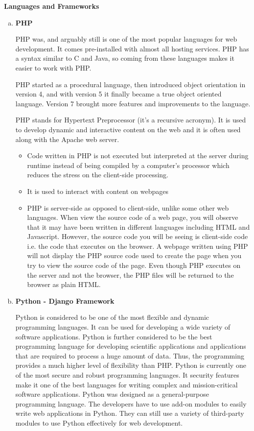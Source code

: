 \documentclass[paper.tex]{subfiles}
\begin{document}
\bigbreak
\textbf{Languages and Frameworks}
\medbreak
\begin{enumerate}[a.]
\item \textbf{PHP}
  \par
  PHP was, and arguably still is one of the most popular languages for web development. It comes pre-installed with almost all hosting services. PHP has a syntax similar to C and Java, so coming from these languages makes it easier to work with PHP.

  PHP started as a procedural language, then introduced object orientation in version 4, and with version 5 it finally became a true object oriented language. Version 7 brought more features and improvements to the language.

  PHP stands for Hypertext Preprocessor (it's a recursive acronym). It is used to develop dynamic and interactive content on the web and it is often used along with the Apache web server.
  \begin{itemize}
    \item Code written in PHP is not executed but interpreted at the server during runtime instead of being compiled by a computer's processor which reduces the stress on the client-side processing.
    \item It is used to interact with content on webpages
    \item  PHP is server-side as opposed to client-side, unlike some other web languages. When view the source code of a web page, you will observe that it may have been written in different languages including HTML and Javascript. However, the source code you will be seeing is client-side code i.e. the code that executes on the browser. A webpage written using PHP will not display the PHP source code used to create the page when you try to view the source code of the page. Even though PHP executes on the server and not the browser, the PHP files will be returned to the browser as plain HTML.
  \end{itemize}
  \medbreak

\item \textbf{Python - Django Framework}
  \par
   Python is considered to be one of the most flexible and dynamic programming languages. It can be used for developing a wide variety of software applications. Python is further considered to be the best programming language for developing scientific applications and applications that are required to process a huge amount of data. Thus, the programming provides a much higher level of flexibility than PHP. Python is currently one of the most secure and robust programming languages. It security features make it one of the best languages for writing complex and mission-critical software applications.  Python was designed as a general-purpose programming language. The developers have to use add-on modules to easily write web applications in Python. They can still use a variety of third-party modules to use Python effectively for web development.


\end{enumerate}
\end{document}
